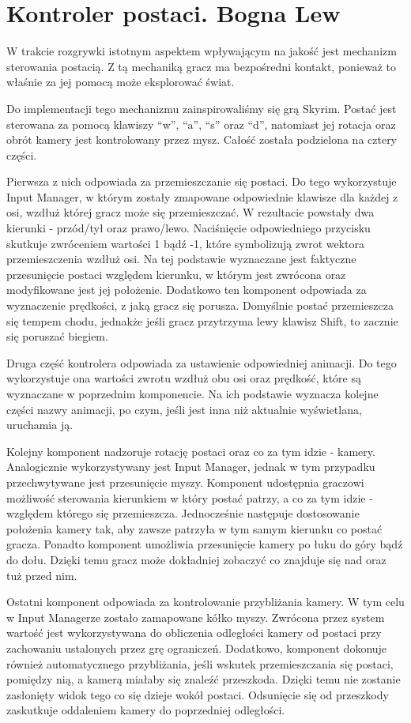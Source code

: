 \section{Kontroler postaci. Bogna Lew}

W trakcie rozgrywki istotnym aspektem wpływającym na jakość jest mechanizm sterowania postacią. Z tą mechaniką gracz ma
bezpośredni kontakt, ponieważ to właśnie za jej pomocą może eksplorować świat.

Do implementacji tego mechanizmu zainspirowaliśmy się grą Skyrim. Postać jest sterowana za pomocą klawiszy “w”, “a”, “s”
oraz “d”, natomiast jej rotacja oraz obrót kamery jest kontrolowany przez mysz. Całość została podzielona na cztery
części.

Pierwsza z nich odpowiada za przemieszczanie się postaci. Do tego wykorzystuje Input Manager, w którym zostały
zmapowane odpowiednie klawisze dla każdej z osi, wzdłuż której gracz może się przemieszczać. W rezultacie powstały dwa
kierunki - przód/tył oraz prawo/lewo. Naciśnięcie odpowiedniego przycisku skutkuje zwróceniem wartości 1 bądź -1, które
symbolizują zwrot wektora przemieszczenia wzdłuż osi. Na tej podstawie wyznaczane jest faktyczne przesunięcie postaci
względem kierunku, w którym jest zwrócona oraz modyfikowane jest jej położenie. Dodatkowo ten komponent odpowiada za
wyznaczenie prędkości, z jaką gracz się porusza. Domyślnie postać przemieszcza się tempem chodu, jednakże jeśli gracz
przytrzyma lewy klawisz Shift, to zacznie się poruszać biegiem.

Druga część kontrolera odpowiada za ustawienie odpowiedniej animacji. Do tego wykorzystuje ona wartości zwrotu wzdłuż
obu osi oraz prędkość, które są wyznaczane w poprzednim komponencie. Na ich podstawie wyznacza kolejne części nazwy
animacji, po czym, jeśli jest inna niż aktualnie wyświetlana, uruchamia ją.

Kolejny komponent nadzoruje rotację postaci oraz co za tym idzie - kamery. Analogicznie wykorzystywany jest Input
Manager, jednak w tym przypadku przechwytywane jest przesunięcie myszy. Komponent udostępnia graczowi możliwość
sterowania kierunkiem w który postać patrzy, a co za tym idzie - względem którego się przemieszcza. Jednocześnie
następuje dostosowanie położenia kamery tak, aby zawsze patrzyła w tym samym kierunku co postać gracza. Ponadto
komponent umożliwia przesunięcie kamery po łuku do góry bądź do dołu. Dzięki temu gracz może dokładniej zobaczyć
co znajduje się nad oraz tuż przed nim.

Ostatni komponent odpowiada za kontrolowanie przybliżania kamery. W tym celu w Input Managerze zostało zamapowane kółko
myszy. Zwrócona przez system wartość jest wykorzystywana do obliczenia odległości kamery od postaci przy zachowaniu
ustalonych przez grę ograniczeń. Dodatkowo, komponent dokonuje również automatycznego przybliżania, jeśli wskutek
przemieszczania się postaci, pomiędzy nią, a kamerą miałaby się znaleźć przeszkoda. Dzięki temu nie zostanie zasłonięty
widok tego co się dzieje wokół postaci. Odsunięcie się od przeszkody zaskutkuje oddaleniem kamery do poprzedniej
odległości.
